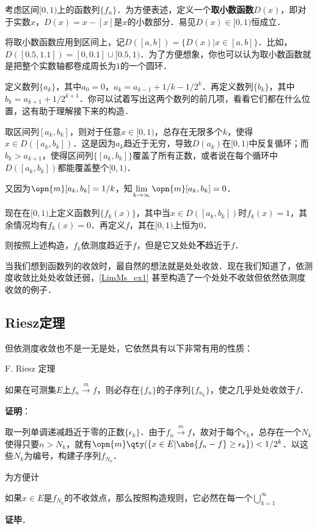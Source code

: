 \begin{example}{}\label{LimMs_ex1}

考虑区间$[0, 1)$上的函数列$\{f_n\}$．为方便表述，定义一个\textbf{取小数函数}$D(x)$，即对于实数$x$，$D(x)=x-[x]$是$x$的小数部分．易见$D(x)\in [0, 1)$恒成立．

将取小数函数应用到区间上，记$D([a, b])=\{D(x)|x\in[a, b]\}$．比如，$D([0.5, 1.1])=[0, 0.1]\cup[0.5, 1)$．为了方便想象，你也可以认为取小数函数就是把整个实数轴都卷成周长为$1$的一个圆环．

定义数列$\{a_k\}$，其中$a_0=0$，$a_k=a_{k-1}+1/k-1/2^k$．再定义数列$\{b_k\}$，其中$b_k=a_{k+1}+1/2^{k+1}$．你可以试着写出这两个数列的前几项，看看它们都在什么位置，这有助于理解接下来的构造．

取区间列$[a_k, b_k]$，则对于任意$x\in[0, 1)$，总存在无限多个$k$，使得$x\in D([a_k, b_k])$．这是因为$a_k$趋近于无穷，导致$D(a_k)$在$[0, 1)$中反复循环；而$b_k>a_{k+1}$，使得区间列$\{[a_k, b_k]\}$覆盖了所有正数，或者说在每个循环中$D([a_k, b_k])$都能覆盖整个$[0, 1)$．

又因为$\opn{m}[a_k, b_k]=1/k$，知$\lim\limits_{k\to \infty}\opn{m}[a_k, b_k]=0$．

现在在$[0, 1)$上定义函数列$\{f_k(x)\}$，其中当$x\in D([a_k, b_k])$时$f_k(x)=1$，其余情况均有$f_k(x)=0$．再定义$f$，其在$[0, 1)$上恒为$0$．

则按照上述构造，$f_k$依测度趋近于$f$，但是它又处处\textbf{不}趋近于$f$．

\end{example}

当我们想到函数列的收敛时，最自然的想法就是处处收敛．现在我们知道了，依测度收敛比处处收敛还弱，\autoref{LimMs_ex1} 甚至构造了一个处处不收敛但依然依测度收敛的例子．


\subsection{Riesz定理}



但依测度收敛也不是一无是处，它依然具有以下非常有用的性质：

\begin{theorem}{F. Riesz 定理}

如果在可测集$E$上$f_n\overset{m}\to f$，则必存在$\{f_n\}$的子序列$\{f_{n_k}\}$，使之几乎处处收敛于$f$．

\end{theorem}

\textbf{证明}：

取一列单调递减趋近于零的正数$\{\epsilon_k\}$．由于$f_n\overset{m}\to f$，故对于每个$\epsilon_k$，总存在一个$N_k$使得只要$n>N_k$，就有$\opn{m}\qty(\{x\in E|\abs{f_n-f}\geq\epsilon_k\})<1/2^k$．以这些$N_k$为编号，构建子序列$f_{N_k}$．

为方便计

如果$x\in E$是$f_{N_k}$的不收敛点，那么按照构造规则，它必然在每一个$\bigcup^\infty_{k=1}$



\textbf{证毕}．






